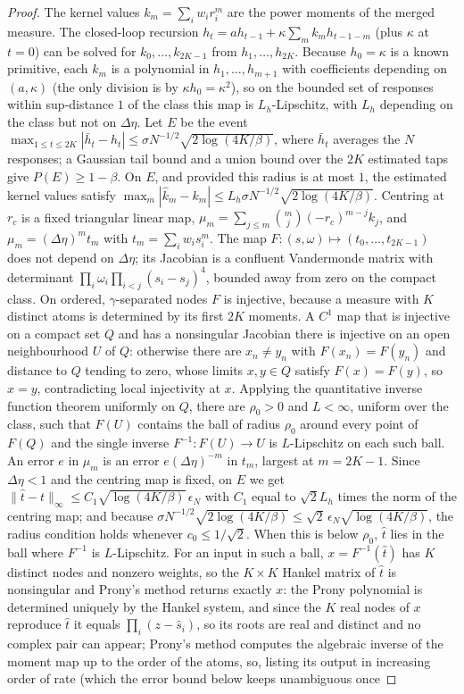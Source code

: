 \documentclass[12pt]{article}
\theoremstyle{definition}
\theoremstyle{remark}
\begin{document}
\begin{proof}
The kernel values $k_m=\sum_iw_ir_i^m$ are the power moments of the merged measure. The closed-loop recursion $h_t=ah_{t-1}+\kappa\sum_mk_mh_{t-1-m}$ (plus $\kappa$ at $t=0$) can be solved for $k_0,\ldots,k_{2K-1}$ from $h_1,\ldots,h_{2K}$. Because $h_0=\kappa$ is a known primitive, each $k_m$ is a polynomial in $h_1,\ldots,h_{m+1}$ with coefficients depending on $(a,\kappa)$ (the only division is by $\kappa h_0=\kappa^2$), so on the bounded set of responses within sup-distance $1$ of the class this map is $L_h$-Lipschitz, with $L_h$ depending on the class but not on $\Delta\eta$. Let $E$ be the event $\max_{1\le t\le2K}|\bar h_t-h_t|\le\sigma N^{-1/2}\sqrt{2\log(4K/\beta)}$, where $\bar h_t$ averages the $N$ responses; a Gaussian tail bound and a union bound over the $2K$ estimated taps give $P(E)\ge1-\beta$. On $E$, and provided this radius is at most $1$, the estimated kernel values satisfy $\max_m|\hat k_m-k_m|\le L_h\sigma N^{-1/2}\sqrt{2\log(4K/\beta)}$. Centring at $r_c$ is a fixed triangular linear map, $\mu_m=\sum_{j\le m}\binom mj(-r_c)^{m-j}k_j$, and $\mu_m=(\Delta\eta)^m t_m$ with $t_m=\sum_iw_is_i^m$. The map $F:(s,\omega)\mapsto(t_0,\ldots,t_{2K-1})$ does not depend on $\Delta\eta$; its Jacobian is a confluent Vandermonde matrix with determinant $\prod_i\omega_i\prod_{i<j}(s_i-s_j)^4$, bounded away from zero on the compact class. On ordered, $\gamma$-separated nodes $F$ is injective, because a measure with $K$ distinct atoms is determined by its first $2K$ moments. A $C^1$ map that is injective on a compact set $Q$ and has a nonsingular Jacobian there is injective on an open neighbourhood $U$ of $Q$: otherwise there are $x_n\ne y_n$ with $F(x_n)=F(y_n)$ and distance to $Q$ tending to zero, whose limits $x,y\in Q$ satisfy $F(x)=F(y)$, so $x=y$, contradicting local injectivity at $x$. Applying the quantitative inverse function theorem uniformly on $Q$, there are $\rho_0>0$ and $L<\infty$, uniform over the class, such that $F(U)$ contains the ball of radius $\rho_0$ around every point of $F(Q)$ and the single inverse $F^{-1}:F(U)\to U$ is $L$-Lipschitz on each such ball. An error $e$ in $\mu_m$ is an error $e(\Delta\eta)^{-m}$ in $t_m$, largest at $m=2K-1$. Since $\Delta\eta<1$ and the centring map is fixed, on $E$ we get $\|\hat t-t\|_\infty\le C_1\sqrt{\log(4K/\beta)}\,\epsilon_N$ with $C_1$ equal to $\sqrt2L_h$ times the norm of the centring map; and because $\sigma N^{-1/2}\sqrt{2\log(4K/\beta)}\le\sqrt2\,\epsilon_N\sqrt{\log(4K/\beta)}$, the radius condition holds whenever $c_0\le1/\sqrt2$. When this is below $\rho_0$, $\hat t$ lies in the ball where $F^{-1}$ is $L$-Lipschitz. For an input in such a ball, $x=F^{-1}(\hat t)$ has $K$ distinct nodes and nonzero weights, so the $K\times K$ Hankel matrix of $\hat t$ is nonsingular and Prony's method returns exactly $x$: the Prony polynomial is determined uniquely by the Hankel system, and since the $K$ real nodes of $x$ reproduce $\hat t$ it equals $\prod_i(z-\hat s_i)$, so its roots are real and distinct and no complex pair can appear; Prony's method computes the algebraic inverse of the moment map up to the order of the atoms, so, listing its output in increasing order of rate (which the error bound below keeps unambiguous once 
\end{proof}
\end{document}
